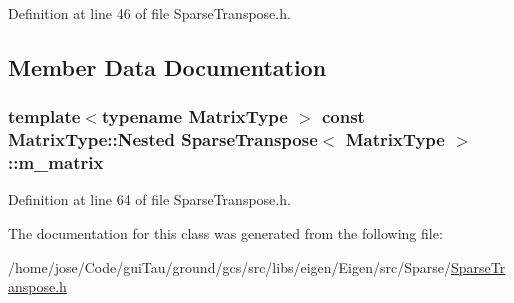 Definition at line 46 of file Sparse\-Transpose.\-h.



\subsection{Member Data Documentation}
\hypertarget{class_sparse_transpose_a318f3dc7a0e87c7adc154bf98c8fd4a8}{
\subsubsection[{m\-\_\-matrix}]{\setlength{\rightskip}{0pt plus 5cm}template$<$typename Matrix\-Type $>$ const Matrix\-Type\-::\-Nested {\bf Sparse\-Transpose}$<$ Matrix\-Type $>$\-::m\-\_\-matrix\hspace{0.3cm}{\ttfamily [protected]}}}\label{class_sparse_transpose_a318f3dc7a0e87c7adc154bf98c8fd4a8}


Definition at line 64 of file Sparse\-Transpose.\-h.



The documentation for this class was generated from the following file\-:\begin{DoxyCompactItemize}
\item 
/home/jose/\-Code/gui\-Tau/ground/gcs/src/libs/eigen/\-Eigen/src/\-Sparse/\hyperlink{_sparse_transpose_8h}{Sparse\-Transpose.\-h}\end{DoxyCompactItemize}
